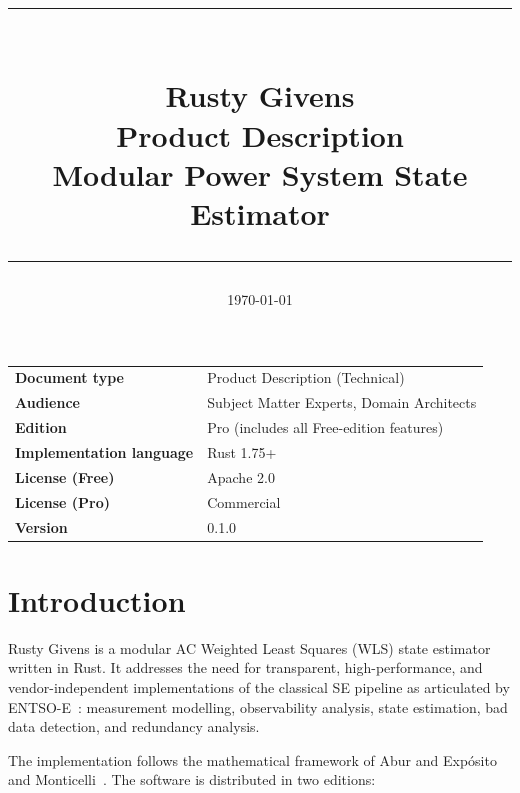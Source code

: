 \documentclass[11pt,a4paper]{article}
\title{%
  \vspace{-1cm}
  {\color{rgorange}\rule{\textwidth}{2pt}}\\[0.4cm]
  {\Huge\bfseries\color{rgblue}Rusty Givens}\\[0.2cm]
  {\Large\color{rggraphite}Product Description}\\[0.1cm]
  {\large\color{rggraphite}Modular Power System State Estimator}\\[0.3cm]
  {\color{rgorange}\rule{\textwidth}{2pt}}
}
\author{}
\date{\today}
\begin{document}
\maketitle
\thispagestyle{empty}

\vspace{1cm}
\begin{center}
\begin{tabular}{ll}
  \toprule
  \textbf{Document type}  & Product Description (Technical) \\
  \textbf{Audience}        & Subject Matter Experts, Domain Architects \\
  \textbf{Edition}         & Pro (includes all Free-edition features) \\
  \textbf{Implementation language} & Rust 1.75+ \\
  \textbf{License (Free)}  & Apache 2.0 \\
  \textbf{License (Pro)}   & Commercial \\
  \textbf{Version}         & 0.1.0 \\
  \bottomrule
\end{tabular}
\end{center}

\clearpage
\tableofcontents
\clearpage



\section{Introduction}\label{sec:intro}

Rusty Givens is a modular AC Weighted Least Squares (\gls{WLS}) state
estimator written in Rust.  It addresses the need for transparent,
high-performance, and vendor-independent implementations of the classical
\gls{SE} pipeline as articulated by ENTSO-E~\cite{entsoe2025}:
measurement modelling, observability analysis, state estimation, bad data
detection, and redundancy analysis.

The implementation follows the mathematical framework of Abur and
Exp\'{o}sito~\cite{abur2004} and Monticelli~\cite{monticelli1999}.  The
software is distributed in two editions:
\end{document}
